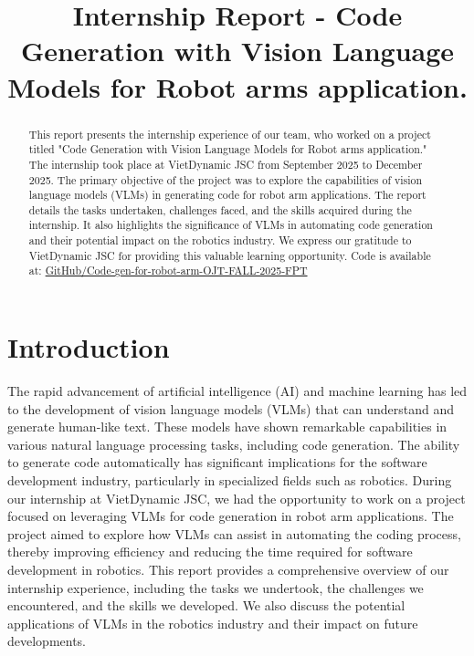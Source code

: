 \documentclass[conference]{IEEEtran}
\begin{document}
\title{Internship Report - Code Generation with Vision Language Models for Robot arms application.}

\author{
}
\maketitle

\begin{abstract}
This report presents the internship experience of our team, who worked on a project titled "Code Generation with Vision Language Models for Robot arms application." The internship took place at VietDynamic JSC from September 2025 to December 2025. The primary objective of the project was to explore the capabilities of vision language models (VLMs) in generating code for robot arm applications. The report details the tasks undertaken, challenges faced, and the skills acquired during the internship. It also highlights the significance of VLMs in automating code generation and their potential impact on the robotics industry. We express our gratitude to VietDynamic JSC for providing this valuable learning opportunity. 
Code is available at: \href{https://github.com/Minhtrna/Code-gen-for-robot-arm-OJT-FALL-2025-FPT}{GitHub/Code-gen-for-robot-arm-OJT-FALL-2025-FPT}
\end{abstract}

\section{Introduction}
The rapid advancement of artificial intelligence (AI) and machine learning has led to the development of vision language models (VLMs) that can understand and generate human-like text. These models have shown remarkable capabilities in various natural language processing tasks, including code generation. The ability to generate code automatically has significant implications for the software development industry, particularly in specialized fields such as robotics.
During our internship at VietDynamic JSC, we had the opportunity to work on a project focused on leveraging VLMs for code generation in robot arm applications. The project aimed to explore how VLMs can assist in automating the coding process, thereby improving efficiency and reducing the time required for software development in robotics.
This report provides a comprehensive overview of our internship experience, including the tasks we undertook, the 
challenges we encountered, and the skills we developed. We also discuss the potential applications of VLMs in the robotics industry and their impact on future developments.
\end{document}
